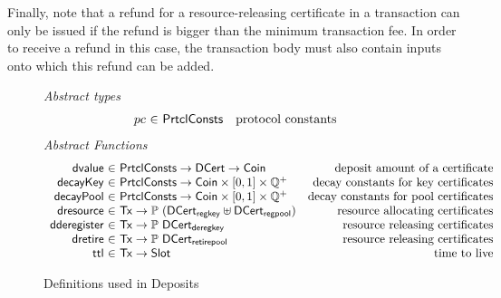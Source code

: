 \documentclass[11pt,a4paper,dvipsnames]{article}
\newcommand{\Tx}{\type{Tx}}
\newcommand{\Coin}{\type{Coin}}
\newcommand{\PrtclConsts}{\type{PrtclConsts}}
\newcommand{\Slot}{\type{Slot}}
\newcommand{\DCert}{\type{DCert}}
\newcommand{\DCertRegKey}{\type{DCert_{regkey}}}
\newcommand{\DCertDeRegKey}{\type{DCert_{deregkey}}}
\newcommand{\DCertRegPool}{\type{DCert_{regpool}}}
\newcommand{\DCertRetirePool}{\type{DCert_{retirepool}}}
\theoremstyle{definition}
\theoremstyle{definition}
\begin{document}
Finally, note that a refund for a resource-releasing certificate in a
transaction can only be issued if the refund is bigger than the minimum
transaction fee. In order to receive a refund in this case, the transaction
body must also contain inputs onto which this refund can be added.


\begin{figure*}
  \emph{Abstract types}
  \begin{equation*}
    \begin{array}{r@{~\in~}lr}
      pc & \PrtclConsts & \text{protocol constants}
    \end{array}
  \end{equation*}
  \emph{Abstract Functions}
  \begin{equation*}
    \begin{array}{r@{~\in~}lr}
      \fun{dvalue} & \PrtclConsts \to \DCert \to \Coin
        & \text{deposit amount of a certificate}\\

      \fun{decayKey} & \PrtclConsts \to
        \Coin\times\lbrack 0, 1\rbrack\times\mathbb{Q}^{+}
        & \text{decay constants for key certificates}\\
      \fun{decayPool} & \PrtclConsts \to
        \Coin\times\lbrack 0, 1\rbrack\times\mathbb{Q}^{+}
        & \text{decay constants for pool certificates}\\

      \fun{dresource} & \Tx \to \powerset{(\DCertRegKey \uniondistinct \DCertRegPool)}
        & \text{resource allocating certificates}\\

      \fun{dderegister} & \Tx \to \powerset{\DCertDeRegKey}
        & \text{resource releasing certificates}\\

      \fun{dretire} & \Tx \to \powerset{\DCertRetirePool}
        & \text{resource releasing certificates}\\

      \fun{ttl} & \Tx \to \Slot
        & \text{time to live}\\
    \end{array}
  \end{equation*}
  \caption{Definitions used in Deposits}
  \label{fig:defs:deposits}
\end{figure*}
\end{document}
